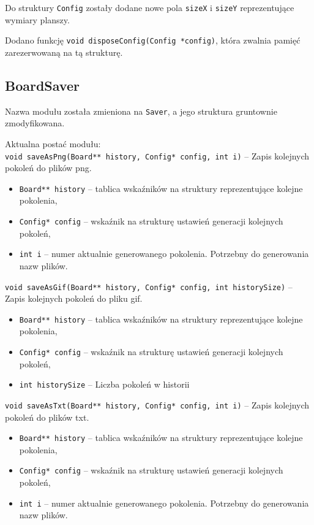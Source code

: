 \documentclass{mwart}
\begin{document}
Do struktury \texttt{Config} zostały dodane nowe pola \texttt{sizeX} i \texttt{sizeY} reprezentujące wymiary planszy. 

Dodano funkcję \texttt{void disposeConfig(Config *config)}, która zwalnia pamięć zarezerwowaną na tą strukturę.

\subsection{BoardSaver}
Nazwa modułu została zmieniona na \texttt{Saver}, a jego struktura gruntownie zmodyfikowana.

Aktualna postać modułu:\\
\texttt{void saveAsPng(Board** history, Config* config, int i)} -- Zapis kolejnych pokoleń do plików png.
\begin{itemize}[label={}]
	\item\texttt{Board** history} -- tablica wskaźników na struktury reprezentujące kolejne pokolenia,
	\item\texttt{Config* config} -- wskaźnik na strukturę ustawień generacji kolejnych pokoleń,
	\item \texttt{int i} -- numer aktualnie generowanego pokolenia. Potrzebny do generowania nazw plików.
\end{itemize}

\noindent{}\texttt{void saveAsGif(Board** history, Config* config, int historySize)} -- Zapis kolejnych pokoleń do pliku gif.
\begin{itemize}[label={}]
	\item\texttt{Board** history} -- tablica wskaźników na struktury reprezentujące kolejne pokolenia,
	\item\texttt{Config* config} -- wskaźnik na strukturę ustawień generacji kolejnych pokoleń,
	\item \texttt{int historySize} -- Liczba pokoleń w historii
\end{itemize}

\noindent{}\texttt{void saveAsTxt(Board** history, Config* config, int i)} -- Zapis kolejnych pokoleń do plików txt.
\begin{itemize}[label={}]
	\item\texttt{Board** history} -- tablica wskaźników na struktury reprezentujące kolejne pokolenia,
	\item\texttt{Config* config} -- wskaźnik na strukturę ustawień generacji kolejnych pokoleń,
	\item \texttt{int i} -- numer aktualnie generowanego pokolenia. Potrzebny do generowania nazw plików.
\end{itemize}
\end{document}
